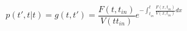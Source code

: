 \begin{equation}
p(t',t|t)=g(t,t')= \frac{F(t,t_{in})}{V(tt_{in})} e^{-\int_{t_{in}}^t \frac{F(x,t_{in})}{V(x,t_{in})} dx}
\end{equation}